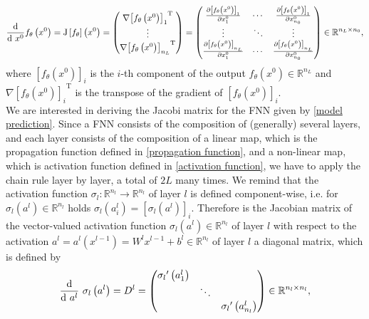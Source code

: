 \begin{equation}
    \label{Jacobi}
    \frac{\textup{d}}{\textup{d} \ x^0} f_{\theta}\left(x^0\right) = \mathrm{J} \left[f_{\theta} \right]\left(x^0\right) = \begin{pmatrix} \nabla {\left[f_{\theta}\left(x^0\right)\right]_{1}}^{\mathrm{T}} \\ \vdots \\  \nabla {\left[f_{\theta}\left(x^0\right)\right]_{n_L}}^{\mathrm{T}} \end{pmatrix} = \begin{pmatrix} \frac{\partial \left[f_{\theta}\left(x^0\right)\right]_1}{\partial x^0_{1}} & \cdots & \frac{\partial \left[f_{\theta}\left(x^0\right)\right]_1}{\partial x^0_{n_0}} \\ \vdots & \ddots & \vdots \\ \frac{\partial \left[f_{\theta}\left(x^0\right)\right]_{n_L}}{\partial x^0_{1}} & \cdots & \frac{\partial \left[f_{\theta}\left(x^0\right)\right]_{n_L}}{\partial x^0_{n_0}} \end{pmatrix} \in \mathbb{R}^{n_L \times n_0}, 
\end{equation}
where $\left[f_{\theta}\left(x^0\right)\right]_i$ is the $i$-th component of the output $f_{\theta}\left(x^0\right) \in \mathbb{R}^{n_L}$ and $\nabla {\left[f_{\theta}\left(x^0\right)\right]_i}^{\mathrm{T}}$ is the transpose of the gradient of $\left[f_{\theta}\left(x^0\right)\right]_i$. \\
We are interested in deriving the Jacobi matrix for the FNN given by \cref{model prediction}. Since a FNN consists of the composition of (generally) several layers, and each layer consists of the composition of a linear map, which is the propagation function defined in \cref{propagation function}, and a non-linear map, which is activation function defined in \cref{activation function}, we have to apply the chain rule layer by layer, a total of $2L$ many times. We remind that the activation function $\sigma_{l} \colon \mathbb{R}^{n_l} \to \mathbb{R}^{n_l}$ of layer $l$ is defined component-wise, i.e. for $\sigma_{l}\left(a^l\right) \in \mathbb{R}^{n_l}$ holds $\sigma_{l}\left(a^l_i\right) = \left[ \sigma_{l}\left(a^l\right) \right]_i$. Therefore is the Jacobian matrix of the vector-valued activation function $\sigma_{l}\left(a^l\right) \in \mathbb{R}^{n_l}$ of layer $l$ with respect to the activation $a^l = a^l\left(x^{l-1}\right) = W^{l} x^{l-1} + b^{l} \in \mathbb{R}^{n_l}$ of layer $l$ a diagonal matrix, which is defined by
\begin{equation}
    \label{derivative:activation:function}
    \frac{\textup{d}}{\textup{d} \ a^{l}} \ \sigma_{l} \left(a^l\right) = D^{l} = \begin{pmatrix} {\sigma_{l}}^{\prime} \left( a^{l}_1 \right) & & \\ & \ddots & \\ & & {\sigma_{l}}^{\prime} \left( a^{l}_{n_l} \right) \end{pmatrix} \in \mathbb{R}^{n_l \times n_l}, 
\end{equation}
